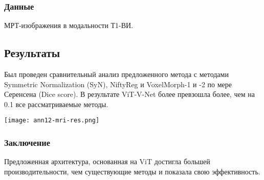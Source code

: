 \subsubsection*{Данные}
МРТ-изображения в модальности Т1-ВИ.
\subsection*{Результаты}
Был проведен сравнительный анализ предложенного метода с методами Symmetric 
Normalization (SyN), NiftyReg и VoxelMorph-1 и -2 по мере Серенсена (Dice score).
В результате ViT-V-Net более превзошла более, чем на 0.1 все рассматриваемые методы.
\\
\begin{minipage}{1.0\linewidth}
    \begin{center}
        \texttt{[image: ann12-mri-res.png]} \\
    \end{center}

\end{minipage}

\subsubsection*{Заключение}
Предложенная архитектура, основанная на ViT достигла большей производительности, чем 
существующие методы и показала свою эффективность.